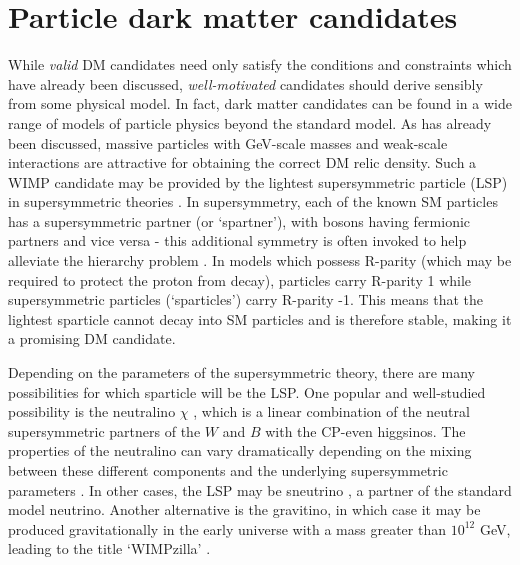 
\section{Particle dark matter candidates}
\label{intro:sec:candidates}


While \textit{valid} DM candidates need only satisfy the conditions and constraints which have already been discussed, \textit{well-motivated} candidates should derive sensibly from some physical model. In fact, dark matter candidates can be found in a wide range of models of particle physics beyond the standard model. As has already been discussed, massive particles with GeV-scale masses and weak-scale interactions are attractive for obtaining the correct DM relic density. Such a WIMP candidate may be provided by the lightest supersymmetric particle (LSP) in supersymmetric theories \cite{Jungman:1995}. In supersymmetry, each of the known SM particles has a supersymmetric partner (or `spartner'), with bosons having fermionic partners and vice versa - this additional symmetry is often invoked to help alleviate the hierarchy problem \cite{Kane:2011}. In models which possess R-parity (which may be required to protect the proton from decay), particles carry R-parity 1 while supersymmetric particles (`sparticles') carry R-parity -1. This means that the lightest sparticle cannot decay into SM particles and is therefore stable, making it a promising DM candidate.


Depending on the parameters of the supersymmetric theory, there are many possibilities for which sparticle will be the LSP. One popular and well-studied possibility is the neutralino $\chi$ \cite{Ellis:1984}, which is a linear combination of the neutral supersymmetric partners of the $W$ and $B$ with the CP-even higgsinos. The properties of the neutralino can vary dramatically depending on the mixing between these different components and the underlying supersymmetric parameters \cite{Shakya:2013}. In other cases, the LSP may be sneutrino \cite{Choi:2013}, a partner of the standard model neutrino. %
Another alternative is the gravitino, in which case it may be produced gravitationally in the early universe with a mass greater than $10^{12}$ GeV, leading to the title `WIMPzilla' \cite{Kolb:1998}.

